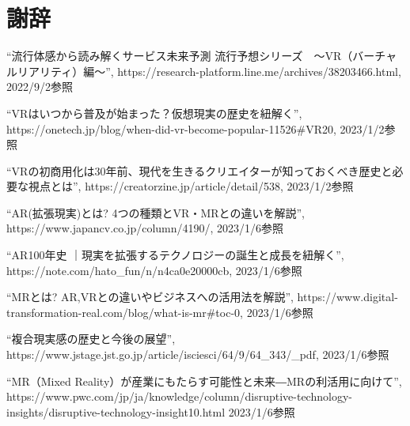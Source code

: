\documentclass[12pt,a4j]{ltjsarticle}
\begin{document}
\section{謝辞}
\begin{thebibliography}{99}
  ``流行体感から読み解くサービス未来予測 流行予想シリーズ　～VR（バーチャルリアリティ）編～'', https://research-platform.line.me/archives/38203466.html, 2022/9/2参照

  ``VRはいつから普及が始まった？仮想現実の歴史を紐解く'', https://onetech.jp/blog/when-did-vr-become-popular-11526\#VR20, 2023/1/2参照

  ``VRの初商用化は30年前、現代を生きるクリエイターが知っておくべき歴史と必要な視点とは'', https://creatorzine.jp/article/detail/538, 2023/1/2参照

  ``AR(拡張現実)とは? 4つの種類とVR・MRとの違いを解説'', https://www.japancv.co.jp/column/4190/, 2023/1/6参照

  ``AR100年史 ｜現実を拡張するテクノロジーの誕生と成長を紐解く'', https://note.com/hato\_fun/n/n4ca0e20000cb, 2023/1/6参照

  ``MRとは? AR,VRとの違いやビジネスへの活用法を解説'', https://www.digital-transformation-real.com/blog/what-is-mr\#toc-0, 2023/1/6参照

  ``複合現実感の歴史と今後の展望'', https://www.jstage.jst.go.jp/article/isciesci/64/9/64_343/\_pdf, 2023/1/6参照

  ``MR（Mixed Reality）が産業にもたらす可能性と未来―MRの利活用に向けて'', https://www.pwc.com/jp/ja/knowledge/column/disruptive-technology-insights/disruptive-technology-insight10.html 2023/1/6参照



\end{thebibliography}
\end{document}
